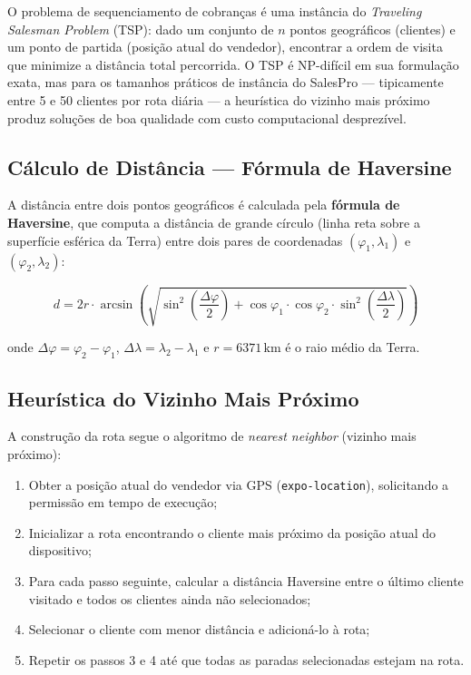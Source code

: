 \documentclass[
	12pt,				%
	oneside,			%
	a4paper,			%
	english,			%
	brazil				%
	]{abntex2}
\begin{document}
O problema de sequenciamento de cobranças é uma instância do \textit{Traveling Salesman Problem} (TSP): dado um conjunto de $n$ pontos geográficos (clientes) e um ponto de partida (posição atual do vendedor), encontrar a ordem de visita que minimize a distância total percorrida. O TSP é NP-difícil em sua formulação exata, mas para os tamanhos práticos de instância do SalesPro — tipicamente entre 5 e 50 clientes por rota diária — a heurística do vizinho mais próximo produz soluções de boa qualidade com custo computacional desprezível.

\subsection{Cálculo de Distância — Fórmula de Haversine}

A distância entre dois pontos geográficos é calculada pela \textbf{fórmula de Haversine}, que computa a distância de grande círculo (linha reta sobre a superfície esférica da Terra) entre dois pares de coordenadas $(\varphi_1, \lambda_1)$ e $(\varphi_2, \lambda_2)$:

\begin{equation}
d = 2r \cdot \arcsin\!\left(\sqrt{\sin^2\!\left(\frac{\Delta\varphi}{2}\right) + \cos\varphi_1 \cdot \cos\varphi_2 \cdot \sin^2\!\left(\frac{\Delta\lambda}{2}\right)}\right)
\label{eq:haversine}
\end{equation}

onde $\Delta\varphi = \varphi_2 - \varphi_1$, $\Delta\lambda = \lambda_2 - \lambda_1$ e $r = 6371\,\text{km}$ é o raio médio da Terra.

\subsection{Heurística do Vizinho Mais Próximo}
\label{subsec:nn}

A construção da rota segue o algoritmo de \textit{nearest neighbor} (vizinho mais próximo):

\begin{enumerate}
  \item Obter a posição atual do vendedor via GPS (\texttt{expo-location}), solicitando a permissão em tempo de execução;
  \item Inicializar a rota encontrando o cliente mais próximo da posição atual do dispositivo;
  \item Para cada passo seguinte, calcular a distância Haversine entre o último cliente visitado e todos os clientes ainda não selecionados;
  \item Selecionar o cliente com menor distância e adicioná-lo à rota;
  \item Repetir os passos 3 e 4 até que todas as paradas selecionadas estejam na rota.
\end{enumerate}
\end{document}
